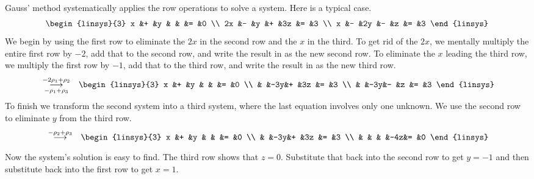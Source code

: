 \begin{example}
Gauss' method systematically applies the row operations to solve a system.
Here is a typical case.
\begin{equation*}
  \begin{linsys}{3}
    x  &+  &y  &   &   &=  &0  \\
   2x  &-  &y  &+  &3z &=  &3  \\
    x  &-  &2y &-  &z  &=  &3  
  \end{linsys}
\end{equation*}
We begin by using the first row to 
eliminate the $2x$ in the second row and the $x$ in the third.
To get rid of the $2x$, we mentally multiply the entire first row by $-2$, 
add that to the
second row, and write the result in as the new second row.
To eliminate the $x$ leading the third row, we multiply the first row by
$-1$, add that to the third row, and write the result in as the
new third row.
\begin{eqnarray*}
  &\grstep[-\rho_1 +\rho_3]{-2\rho_1 +\rho_2}
  &\begin{linsys}{3}
     x  &+  &y  &   &   &=  &0  \\
        &   &-3y&+  &3z &=  &3  \\
        &   &-3y&-  &z  &=  &3  
  \end{linsys}   
\end{eqnarray*}
To finish we transform the second system into a third system, where the
last equation involves only one unknown. 
We use 
the second row to eliminate $y$ from the third row.
\begin{eqnarray*}
  &\grstep{-\rho_2 +\rho_3}
  &\begin{linsys}{3}
     x  &+  &y  &   &   &=  &0  \\
        &   &-3y&+  &3z &=  &3  \\
        &   &   &   &-4z&=  &0
   \end{linsys}
\end{eqnarray*}
Now the system's solution is easy to find.
The third row shows that \( z=0 \).
Substitute that back%
into the second row to get \( y=-1 \) and
then substitute back into the first row to get \( x=1 \).
\end{example}

